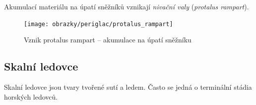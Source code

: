 Akumulací materiálu na úpatí sněžníků vznikají \emph{nivační valy} (\textit{protalus rampart}).
\begin{figure}
	\centering
	\texttt{[image: obrazky/periglac/protalus\_rampart]}
	\caption{Vznik protalus rampart -- akumulace na úpatí sněžníku}
	\label{fig:protalusrampart}
\end{figure}


\subsection{Skalní ledovce}
Skalní ledovce jsou tvary tvořené sutí a ledem. Často se jedná o terminální stádia horských ledovců.  


%		
%
%	
